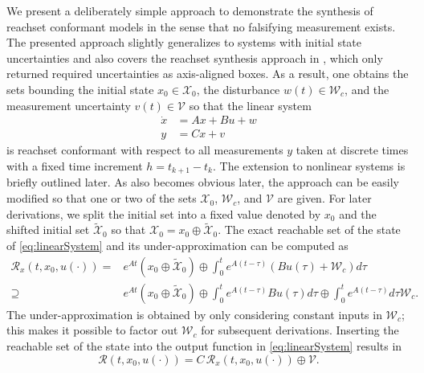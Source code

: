 \documentclass[EPiC]{easychair}
\renewcommand{\^}[1]{^{(#1)}}
\begin{document}
We present a deliberately simple approach to demonstrate the synthesis of reachset conformant models in the sense that no falsifying measurement exists. The presented approach slightly generalizes \cite[Sec.~III.B]{Liu2023} to systems with initial state uncertainties and also covers the reachset synthesis approach in \cite[Sec.~IV.C]{Liu2018a}, which only returned required uncertainties as axis-aligned boxes. As a result, one obtains the sets bounding the initial state $x_0 \in \mathcal{X}_0$, the disturbance $w(t) \in \mathcal{W}_c$, and the measurement uncertainty $v(t) \in \mathcal{V}$ so that the linear system
\begin{equation}\label{eq:linearSystem}
\begin{split}
 \dot{x} &=  A x + B u + w \\
 y &= C x + v
\end{split}
\end{equation}
is reachset conformant with respect to all measurements $y$ taken at discrete times with a fixed time increment $h=t_{k+1}-t_k$. The extension to nonlinear systems is briefly outlined later. As also becomes obvious later, the approach can be easily modified so that one or two of the sets $\mathcal{X}_0$, $\mathcal{W}_c$, and $\mathcal{V}$ are given. For later derivations, we split the initial set into a fixed value denoted by $x_0$ and the shifted initial set $\tilde{\mathcal{X}}_0$ so that $\mathcal{X}_0 = x_0 \oplus \tilde{\mathcal{X}}_0$. The exact reachable set of the state of \eqref{eq:linearSystem} and its under-approximation \cite[Prop.~1]{Liu2018a} can be computed as 
\begin{equation}
\label{eq:reachableSetOfState}
\begin{split}
    \mathcal{R}_x(t,x_0,u(\cdot)) =& e^{At} (x_0 \oplus \tilde{\mathcal{X}}_0) \oplus \int_{0}^{t}e^{A(t-\tau)}( B u(\tau) + \mathcal{W}_c) d\tau \\
\supseteq& e^{At} (x_0 \oplus \tilde{\mathcal{X}}_0) \oplus \int_{0}^{t}e^{A(t-\tau)} B u(\tau) d\tau \oplus \int_{0}^{t}e^{A(t-\tau)}d\tau \mathcal{W}_c.
\end{split}
\end{equation}
The under-approximation is obtained by only considering constant inputs in $\mathcal{W}_c$; this makes it possible to factor out $\mathcal{W}_c$ for subsequent derivations. Inserting the reachable set of the state into the output function in \eqref{eq:linearSystem} results in
\begin{equation}
\label{eq:reachableSet}
    \mathcal{R}(t,x_0,u(\cdot)) = C \, \mathcal{R}_x(t,x_0,u(\cdot)) \oplus \mathcal{V}.
\end{equation}
\end{document}
